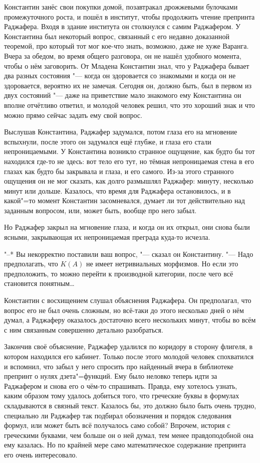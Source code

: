 Константин занёс свои покупки домой, позавтракал дрожжевыми булочками
промежуточного роста, и пошёл в институт, чтобы продолжить чтение препринта
Раджафера.
Входя в здание института он столкнулся с самим Раджафером.
У Константина был некоторый вопрос, связанный с его недавно доказанной теоремой,
про который тот мог кое-что знать, возможно, даже не хуже Варанга.
Вчера за обедом, во время общего разговора, он не нашёл удобного момента, чтобы
о нём заговорить.
От Младена Константин знал, что у Раджафера бывает два разных состояния "---
когда он здоровается со знакомыми и когда он не здоровается, вероятно их не
замечая.
Сегодня он, должно быть, был в первом из двух состояний "--- даже на приветствие
мало знакомого ему Константина он вполне отчётливо ответил, и молодой человек
решил, что это хороший знак и что можно прямо сейчас задать ему свой вопрос.

Выслушав Константина, Раджафер задумался, потом глаза его на мгновение
вспыхнули, после этого он задумался ещё глубже, и глаза его стали
непроницаемыми.
У Константина возникло странное ощущение, как будто бы тот находился где-то не
здесь: вот тело его тут, но тёмная непроницаемая стена в его глазах как будто бы
закрывала и глаза, и его самого.
Из-за этого странного ощущения он не мог сказать, как долго размышлял Раджафер:
минуту, несколько минут или дольше.
Казалось, что время для Раджафера остановилось, и в какой"=то момент Константин
засомневался, думает ли тот действительно над заданным вопросом, или, может
быть, вообще про него забыл.

Но Раджафер закрыл на мгновение глаза, и когда он их открыл, они снова были
ясными, закрывающая их непроницаемая преграда куда-то исчезла.

"--* Вы некорректно поставили ваш вопрос, "--- сказал он Константину.
"--- Надо предполагать, что $K(A)$ не имеет нетривиальных морфизмов.
Но если это предположить, то можно перейти к производной категории, после чего
всё становится понятным\ldots

Константин с восхищением слушал объяснения Раджафера.
Он предполагал, что вопрос его не был очень сложным, но всё-таки до этого
несколько дней о нём думал, а Раджаферу оказалось достаточно всего нескольких
минут, чтобы во всём с ним связанным совершенно детально разобраться.

Закончив своё объяснение, Раджафер удалился по коридору в сторону флигеля, в
котором находился его кабинет.
Только после этого молодой человек спохватился и вспомнил, что забыл у него
спросить про найденный вчера в библиотеке препринт о нулях дзета"=функций.
Ему было неловко теперь идти за Раджафером и снова его о чём-то спрашивать.
Правда, ему хотелось узнать, каким образом тому удалось добиться того, что
греческие буквы в формулах складываются в связный текст.
Казалось бы, это должно было быть очень трудно, специально ли Раджафер так
подбирал обозначения и порядок следования формул, или может быть всё получалось
само собой?
Впрочем, история с греческими буквами, чем больше он о ней думал, тем менее
правдоподобной она ему казалась.
Но по крайней мере само математическое содержание препринта его очень
интересовало.

